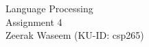 \begin{center}
\vfill
{\huge Language Processing}\\
{\large Assignment 4}\\
{\large Zeerak Waseem (KU-ID: csp265)}
\vfill
\end{center}

\newpage
